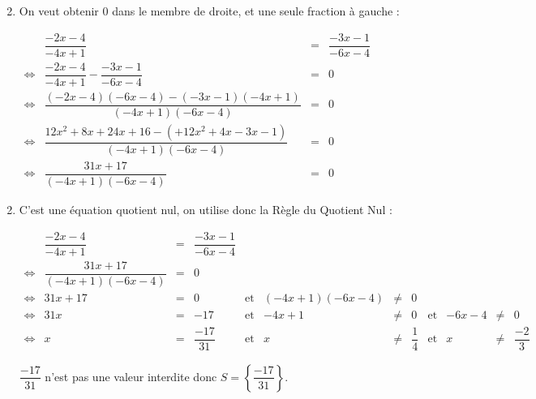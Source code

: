 \documentclass[15pt, mathserif]{beamer}
\begin{document}
 \begin{frame} 
 \begin{enumerate} \setcounter{enumi}{1}  
 	 \item On veut obtenir $0$ dans le membre de droite, et une seule fraction à gauche : 
 
 	 $\begin{array}{crcl} 
 	 	 & \dfrac{-2x-4}{-4x+1} & = &\dfrac{-3x-1}{-6x-4} \\ 
 	 \Leftrightarrow & \dfrac{-2x-4}{-4x+1}-\dfrac{-3x-1}{-6x-4} & = & 0 \\ 
 
 \Leftrightarrow & \dfrac{(-2x-4)(-6x-4)-(-3x-1)(-4x+1)}{(-4x+1)(-6x-4)} & = & 0 \\ \Leftrightarrow & \dfrac{12x^2+8x+24x+16-(+12x^2+4x-3x-1)}{(-4x+1)(-6x-4)}& = & 0 \\ \Leftrightarrow & \dfrac{31x+17}{(-4x+1)(-6x-4)} & = & 0 
 	 \end{array}$ 
 \end{enumerate} 
 \end{frame} 
 \begin{frame} 
 \begin{enumerate} \setcounter{enumi}{1}  
 	 \item C'est une équation quotient nul, on utilise donc la Règle du Quotient Nul :
 
  \tiny{$\begin{array}{crclcrclcrcl} 
 
 	  & \dfrac{-2x-4}{-4x+1} & = &\dfrac{-3x-1}{-6x-4} & & & & & & & & \\ 
 	 \Leftrightarrow & \dfrac{31x+17}{(-4x+1)(-6x-4)} & = & 0 & & & & & & & & \\ 
 	 \Leftrightarrow & 31x+17 & =& 0 & \text{et} & (-4x+1)(-6x-4) & \neq & 0 \\ 
 	 \Leftrightarrow & 31x&=&-17& \text{et} & -4x+1& \neq & 0 & \text{et} & -6x-4& \neq & 0 \\ 
 	 \Leftrightarrow & x&=&\dfrac{-17}{31} & \text{et} & x &\neq&\dfrac{1}{4} & \text{et} & x & \neq&\dfrac{-2}{3}
 
 \end{array}$} 
 
 \bigskip 
 
 \normalsize{ $ \dfrac{-17}{31} $ n'est pas une valeur interdite donc $S=\left\{ \dfrac{-17}{31}\right\}$.} 
 
 \end{enumerate} \end{frame}
\end{document}
